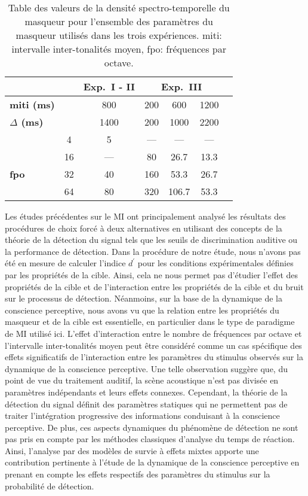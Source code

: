 \begin{table}[!t]
\caption[Table des valeurs de densité spectro-temporelle du masqueur]{Table des valeurs de la densité spectro-temporelle du masqueur pour l'ensemble des paramètres du masqueur utilisés dans les trois expériences. miti: intervalle inter-tonalités moyen, fpo: fréquences par octave.} 
\label{tab:DST}
\footnotesize
\centering
\begin{tabular}{|l||*{6}{c|}}
\hline
 & & \multicolumn{1}{c|}{\textbf{Exp.~I - II}} & \multicolumn{3}{c|}{\textbf{Exp.~III}} \\
\hline
\textbf{miti (ms)}      & & 800  & 200 & 600 & 1200 \\ 
\textbf{$\Delta$ (ms)}  & & 1400 & 200 & 1000 & 2200\\
\hline
                & 4  & 5 & --- & --- & ---\\
                & 16 & --- & 80 & 26.7 & 13.3\\
\textbf{fpo}    & 32 & 40 & 160 & 53.3 & 26.7\\
                & 64 & 80 & 320 & 106.7 & 53.3\\
\hline
\end{tabular}
\end{table}

Les études précédentes sur le MI ont principalement analysé les résultats des procédures de choix forcé à deux alternatives en utilisant des concepts de la théorie de la détection du signal tels que les seuils de discrimination auditive \citep{alexander2004informational, neff1987masking, watson1976factors} ou la performance de détection. 
Dans la procédure de notre étude, nous n'avons pas été en mesure de calculer l'indice $d^\prime$ pour les conditions expérimentales définies par les propriétés de la cible. 
Ainsi, cela ne nous permet pas d'étudier l'effet des propriétés de la cible et de l'interaction entre les propriétés de la cible et du bruit sur le processus de détection. 
Néanmoins, sur la base de la dynamique de la conscience perceptive, nous avons vu que la relation entre les propriétés du masqueur et de la cible est essentielle, en particulier dans le type de paradigme de MI utilisé ici. 
L'effet d'interaction entre le nombre de fréquences par octave et l'intervalle inter-tonalités moyen peut être considéré comme un cas spécifique des effets significatifs de l'interaction entre les paramètres du stimulus observés sur la dynamique de la conscience perceptive. 
Une telle observation suggère que, du point de vue du traitement auditif, la scène acoustique n'est pas divisée en paramètres indépendants et leurs effets connexes. 
Cependant, la théorie de la détection du signal définit des paramètres statiques qui ne permettent pas de traiter l'intégration progressive des informations conduisant à la conscience perceptive. 
De plus, ces aspects dynamiques du phénomène de détection ne sont pas pris en compte par les méthodes classiques d'analyse du temps de réaction. 
Ainsi, l'analyse par des modèles de survie à effets mixtes apporte une contribution pertinente à l'étude de la dynamique de la conscience perceptive en prenant en compte les effets respectifs des paramètres du stimulus sur la probabilité de détection.

